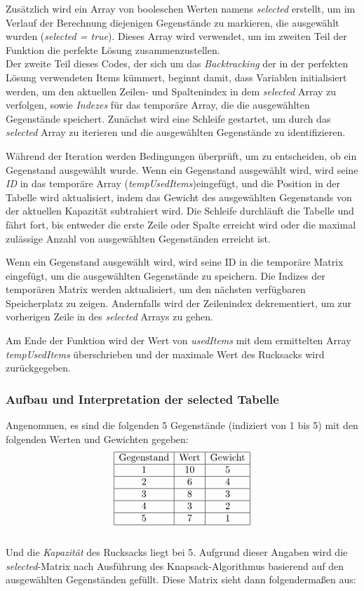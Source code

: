 Zusätzlich wird ein Array von booleschen Werten namens \textit{selected} erstellt, um im Verlauf der Berechnung diejenigen
Gegenstände zu markieren, die ausgewählt wurden (\textit{selected = true}). Dieses Array wird verwendet, um im zweiten
Teil der Funktion die perfekte Lösung zusammenzustellen.\\

Der zweite Teil dieses Codes, der sich um das \textit{Backtracking} der in der perfekten Lösung verwendeten Items kümmert,
beginnt damit, dass Variablen initialisiert werden, um den aktuellen Zeilen- und Spaltenindex in dem \textit{selected}
Array zu verfolgen, sowie \textit{Indezes} für das temporäre Array, die die ausgewählten Gegenstände speichert. Zunächst
wird eine Schleife gestartet, um durch das \textit{selected} Array
zu iterieren und die ausgewählten Gegenstände zu identifizieren.

Während der Iteration werden Bedingungen überprüft, um zu entscheiden, ob ein Gegenstand ausgewählt wurde. Wenn ein
Gegenstand ausgewählt wird, wird seine \textit{ID} in das temporäre Array (\textit{tempUsedItems})eingefügt, und die
Position in der Tabelle wird aktualisiert, indem das Gewicht des ausgewählten Gegenstands von der aktuellen Kapazität
subtrahiert wird. Die Schleife durchläuft die Tabelle und fährt fort, bis entweder die erste Zeile oder Spalte erreicht
wird oder die maximal zulässige Anzahl von ausgewählten Gegenständen erreicht ist.

Wenn ein Gegenstand ausgewählt wird, wird seine ID in die temporäre Matrix eingefügt, um die ausgewählten Gegenstände zu
speichern. Die Indizes der temporären Matrix werden aktualisiert, um den nächsten verfügbaren Speicherplatz zu zeigen.
Andernfalls wird der Zeilenindex dekrementiert, um zur vorherigen Zeile in des \textit{selected} Arrays zu gehen.

Am Ende der Funktion wird der Wert von \textit{usedItems} mit dem ermittelten Array \textit{tempUsedItems} überschrieben
und der maximale Wert des Rucksacks wird zurückgegeben.
\subsubsection*{Aufbau und Interpretation der selected Tabelle}
Angenommen, es sind die folgenden  5 Gegenstände (indiziert von 1 bis 5) mit den folgenden Werten und Gewichten gegeben:
\[
\begin{array}{|c|c|c|}
\hline
\text{Gegenstand} & \text{Wert} & \text{Gewicht} \\
\hline
1 & 10 & 5 \\
\hline
2 & 6 & 4 \\
\hline
3 & 8 & 3 \\
\hline
4 & 3 & 2 \\
\hline
5 & 7 & 1 \\
\hline
\end{array}
\]
\\
Und die \textit{Kapazität} des Rucksacks liegt bei 5. Aufgrund dieser Angaben wird die \textit{selected}-Matrix nach
Ausführung des Knapsack-Algorithmus basierend auf den ausgewählten Gegenständen gefüllt. Diese Matrix sieht dann folgendermaßen
aus:

